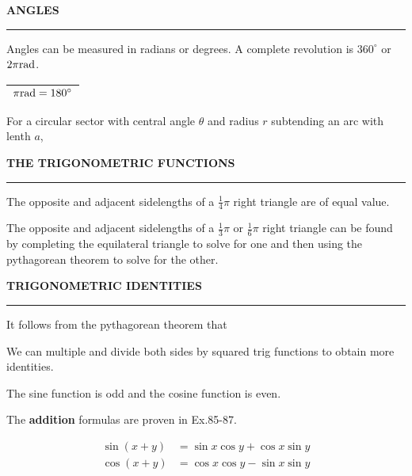 \documentclass{article}
\begin{document}
{\bf{}ANGLES}
\hrule

\vspace{10pt}

Angles can be measured in radians or degrees. A complete revolution is $360^\circ$ or $2\pi\textnormal{rad}$.

\begin{center}
\bgroup
\def\arraystretch{1.5}
\begin{tabular}{|l|}
\hline
$\pi\textnormal{rad}=180^\circ$\\
\hline
\end{tabular}
\egroup
\end{center}

For a circular sector with central angle $\theta$ and radius $r$ subtending an arc with lenth $a$, 

\vspace{10pt}

{\bf{}THE TRIGONOMETRIC FUNCTIONS}
\hrule

\vspace{10pt}

The opposite and adjacent sidelengths of a $\frac{1}{4}\pi$ right triangle are of equal value.

\vspace{10pt}

The opposite and adjacent sidelengths of a $\frac{1}{3}\pi$ or $\frac{1}{6}\pi$ right triangle can be found by completing the equilateral triangle to solve for one and then using the pythagorean theorem to solve for the other.

\vspace{10pt}

{\bf{}TRIGONOMETRIC IDENTITIES}
\hrule

\vspace{10pt}

It follows from the pythagorean theorem that 

\vspace{10pt}

We can multiple and divide both sides by squared trig functions to obtain more identities.

The sine function is odd and the cosine function is even.

The {\bf{}addition} formulas are proven in Ex.85-87.

\bgroup
\def\arraystretch{1.5}
\[\boxed{\begin{aligned}
\sin(x+y)&=\sin x\cos y+\cos x\sin y\\
\cos(x+y)&=\cos x\cos y-\sin x\sin y
\end{aligned}}\]
\egroup
\end{document}
